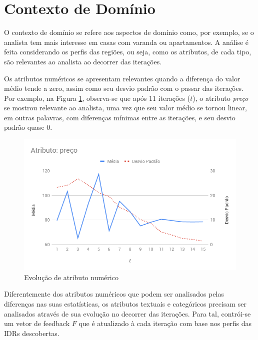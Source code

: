 
\section{Contexto de Domínio}

O contexto de domínio se refere aos aspectos de domínio como, por exemplo, se o analista tem mais interesse em casas com varanda ou apartamentos. A análise é feita considerando os perfis das regiões, ou seja, como os atributos, de cada tipo, são relevantes ao analista ao decorrer das iterações.


Os atributos numéricos se apresentam relevantes quando a diferença do valor médio tende a zero, assim como seu desvio padrão com o passar das iterações. Por exemplo, na Figura \ref{fig:analise-atributo-numerico}, observa-se que após 11 iterações ($t$), o atributo {\em preço} se mostrou relevante ao analista, uma vez que seu valor médio se tornou linear, em outras palavras, com diferenças mínimas entre as iterações, e seu desvio padrão quase 0.

\begin{figure}[!h]
	\centering
	\includegraphics[width=\textwidth]{imagens/analise-atributo-numerico}
	\caption{Evolução de atributo numérico}
	\label{fig:analise-atributo-numerico}
\end{figure}

Diferentemente dos atributos numéricos que podem ser analisados pelas diferenças nas suas estatísticas, os atributos textuais e categóricos precisam ser analisados através de sua evolução no decorrer das iterações. Para tal, contrói-se um vetor de feedback $F$ que é atualizado à cada iteração com base nos perfis das IDRs descobertas.

